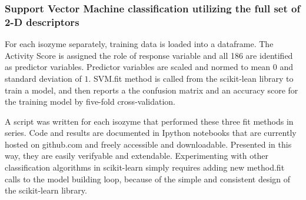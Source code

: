 \subsubsection{Support Vector Machine classification utilizing the full set of 2-D descriptors}
For each isozyme separately, training data is loaded into a dataframe. The Activity Score is assigned the role of response variable and all 186 are identified as predictor variables. Predictor variables are scaled and normed to mean $0$ and standard deviation of $1$. SVM.fit method is called from the scikit-lean library to train a model, and then reports a the confusion matrix and an accuracy score for the training model by five-fold cross-validation.

A script was written for each isozyme that performed these three fit methods in series. Code and results are documented in Ipython notebooks that are currently hosted on github.com and freely accessible and downloadable. Presented in this way, they are easily verifyable and extendable. Experimenting with other classification algorithms in scikit-learn simply requires adding new method.fit calls to the model building loop, because of the simple and consistent design of the scikit-learn library.

